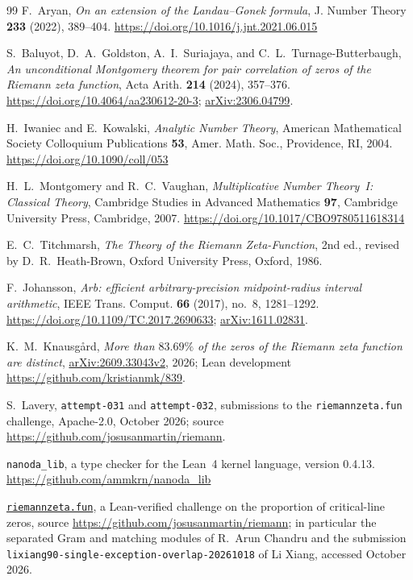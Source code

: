 \documentclass[11pt]{article}
\theoremstyle{definition}
\begin{document}
\begin{thebibliography}{99}
F.~Aryan,
\emph{On an extension of the Landau--Gonek formula}, J. Number Theory
\textbf{233} (2022), 389--404. \url{https://doi.org/10.1016/j.jnt.2021.06.015}

S.~Baluyot, D.~A.~Goldston, A.~I.~Suriajaya, and C.~L.~Turnage-Butterbaugh,
\emph{An unconditional Montgomery theorem for pair correlation of zeros of the
Riemann zeta function}, Acta Arith. \textbf{214} (2024), 357--376.
\url{https://doi.org/10.4064/aa230612-20-3}; \href{https://arxiv.org/abs/2306.04799}{arXiv:2306.04799}.

H.~Iwaniec and E.~Kowalski,
\emph{Analytic Number Theory}, American Mathematical Society Colloquium
Publications \textbf{53}, Amer. Math. Soc., Providence, RI, 2004.
\url{https://doi.org/10.1090/coll/053}

H.~L.~Montgomery and R.~C.~Vaughan,
\emph{Multiplicative Number Theory~I: Classical Theory}, Cambridge Studies in
Advanced Mathematics \textbf{97}, Cambridge University Press, Cambridge, 2007.
\url{https://doi.org/10.1017/CBO9780511618314}

E.~C.~Titchmarsh,
\emph{The Theory of the Riemann Zeta-Function}, 2nd ed., revised by
D.~R.~Heath-Brown, Oxford University Press, Oxford, 1986.

F.~Johansson,
\emph{Arb: efficient arbitrary-precision midpoint-radius interval arithmetic},
IEEE Trans. Comput. \textbf{66} (2017), no.~8, 1281--1292.
\url{https://doi.org/10.1109/TC.2017.2690633}; \href{https://arxiv.org/abs/1611.02831}{arXiv:1611.02831}.

K.~M.~Knausg\aa rd,
\emph{More than $83.69\%$ of the zeros of the Riemann zeta function are
distinct}, \href{https://arxiv.org/abs/2609.33043}{arXiv:2609.33043v2}, 2026; Lean development
\url{https://github.com/kristianmk/839}.

S.~Lavery, \texttt{attempt-031} and \texttt{attempt-032}, submissions to
the \texttt{riemannzeta.fun} challenge, Apache-2.0, October 2026; source
\url{https://github.com/josusanmartin/riemann}.

\texttt{nanoda\_lib}, a type checker for the Lean~4 kernel language,
version 0.4.13. \url{https://github.com/ammkrn/nanoda_lib}

\href{https://riemannzeta.fun}{\texttt{riemannzeta.fun}}, a Lean-verified challenge on the proportion of
critical-line zeros, source \url{https://github.com/josusanmartin/riemann};
in particular the separated Gram and matching modules of R.~Arun Chandru and
the submission \texttt{lixiang90-single-exception-overlap-20261018} of Li
Xiang, accessed October 2026.

\end{thebibliography}
\end{document}

